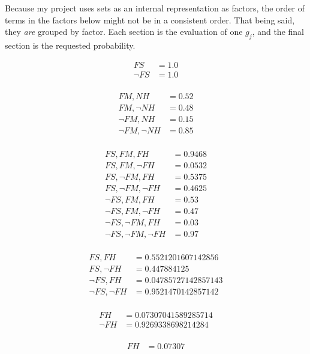 \documentclass[12pt]{article}
\begin{document}
\problemsub
Because my project uses sets as an internal representation as factors, the order of terms in the factors below might not
be in a consistent order. That being said, they \textit{are} grouped by factor. Each section is the evaluation of one
$g_j$, and the final section is the requested probability.

\begin{align*}
FS &= 1.0 \\
\lnot FS &= 1.0 \\
\end{align*}

\begin{align*}
FM, NH &= 0.52 \\
FM, \lnot NH &= 0.48 \\
\lnot FM, NH &= 0.15 \\
\lnot FM, \lnot NH &= 0.85 \\
\end{align*}

\begin{align*}
FS, FM, FH &= 0.9468 \\
FS, FM, \lnot FH &= 0.0532 \\
FS, \lnot FM, FH &= 0.5375 \\
FS, \lnot FM, \lnot FH &= 0.4625 \\
\lnot FS, FM, FH &= 0.53 \\
\lnot FS, FM, \lnot FH &= 0.47 \\
\lnot FS, \lnot FM, FH &= 0.03 \\
\lnot FS, \lnot FM, \lnot FH &= 0.97 \\
\end{align*}

\begin{align*}
FS, FH &= 0.5521201607142856 \\
FS, \lnot FH &= 0.447884125 \\
\lnot FS, FH &= 0.04785727142857143 \\
\lnot FS, \lnot FH &= 0.9521470142857142 \\
\end{align*}

\begin{align*}
FH &= 0.07307041589285714 \\
\lnot FH &= 0.9269338698214284 \\
\end{align*}

\begin{align*}
FH &= 0.07307 \\
\end{align*}
\end{document}
